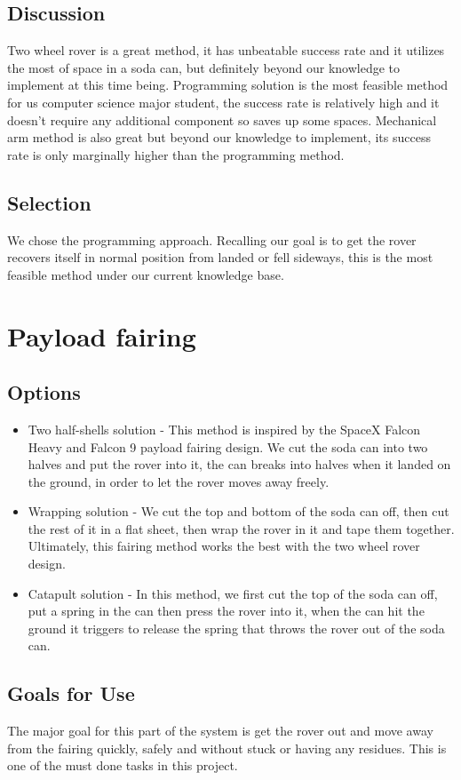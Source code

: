 \documentclass[10pt,serif,draftclsnofoot,onecolumn]{IEEEtran}
\begin{document}
\subsection{Discussion}
Two wheel rover is a great method, it has unbeatable success rate and it utilizes the most of space in a soda can, but definitely beyond our knowledge to implement at this time being. Programming solution is the most feasible method for us computer science major student, the success rate is relatively high and it doesn't require any additional component so saves up some spaces. Mechanical arm method is also great but beyond our knowledge to implement, its success rate is only marginally higher than the programming method. 

\subsection{Selection}
We chose the programming approach. Recalling our goal is to get the rover recovers itself in normal position from landed or fell sideways, this is the most feasible method under our current knowledge base. 

\section{Payload fairing}
\subsection{Options}
\begin{itemize}
	\item Two half-shells solution\cite{SpaceX} - This method is inspired by the SpaceX Falcon Heavy and Falcon 9 payload fairing design. We cut the soda can into two halves and put the rover into it, the can breaks into halves when it landed on the ground, in order to let the rover moves away freely. 
	\item Wrapping solution - We cut the top and bottom of the soda can off, then cut the rest of it in a flat sheet, then wrap the rover in it and tape them together. Ultimately, this fairing method works the best with the two wheel rover design.  
	\item Catapult solution - In this method, we first cut the top of the soda can off, put a spring in the can then press the rover into it, when the can hit the ground it triggers to release the spring that throws the rover out of the soda can. 
\end{itemize}
\subsection{Goals for Use}
The major goal for this part of the system is get the rover out and move away from the fairing quickly, safely and without stuck or having any residues. This is one of the must done tasks in this project.  
\end{document}
